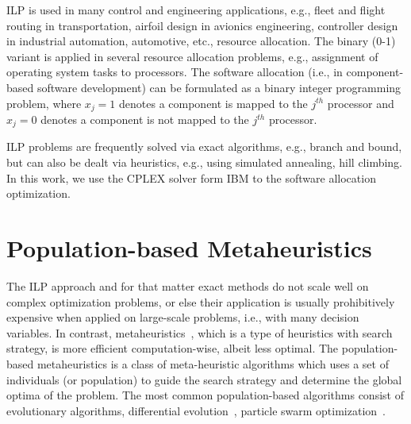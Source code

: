 ILP is used in many control and engineering applications, e.g., fleet and flight routing in transportation, airfoil design in avionics engineering, controller design in industrial automation, automotive, etc., resource allocation. The binary (0-1) variant is applied in several resource allocation problems, e.g., assignment of operating system tasks to processors. The software allocation (i.e., in component-based software development) can be formulated as a binary integer programming problem, where $x_j=1$ denotes a component is mapped to the $j^{th}$ processor and $x_j=0$ denotes a component is not mapped to the $j^{th}$ processor.

ILP problems are frequently solved via exact algorithms, e.g., branch and bound, but can also be dealt via heuristics, e.g., using simulated annealing, hill climbing. In this work, we use the CPLEX solver form IBM to the software allocation optimization.
\section{Population-based Metaheuristics}
The ILP approach and for that matter exact methods do not scale well on complex optimization problems, or else their application is usually prohibitively expensive when applied on large-scale problems, i.e., with many decision variables. In contrast, metaheuristics~\cite{2006HandbookMetaheuristics}\cite{Gonzalez2007HandbookMetaheuristics}, which is a type of heuristics with search strategy, is more efficient computation-wise, albeit less optimal. The population-based metaheuristics is a class of meta-heuristic algorithms which uses a set of individuals (or population) to guide the search strategy and determine the global optima of the problem. The most common population-based algorithms consist of evolutionary algorithms, differential evolution~\cite{Storn1997DifferentialSpaces}\cite{Das2016RecentSurvey}, particle swarm optimization~\cite{Poli2008AnApplications}\cite{Mirjalili2019ParticleOptimisation}.

